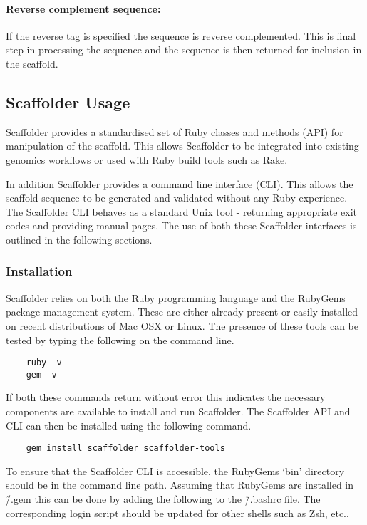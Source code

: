 \documentclass[10pt]{bmc_article}
\newenvironment{bmcformat}{\begin{raggedright}\baselineskip20pt\sloppy\setboolean{publ}{false}}{\end{raggedright}\baselineskip20pt\sloppy}
\begin{document}
\begin{bmcformat}
\paragraph{Reverse complement sequence:} If the reverse tag is specified the
sequence is reverse complemented. This is final step in processing the
sequence and the sequence is then returned for inclusion in the scaffold. \pb

\subsection*{Scaffolder Usage} %

Scaffolder provides a standardised set of Ruby classes and methods (API) for
manipulation of the scaffold. This allows Scaffolder to be integrated into
existing genomics workflows or used with Ruby build tools such as Rake. \pb

In addition Scaffolder provides a command line interface (CLI). This allows
the scaffold sequence to be generated and validated without any Ruby
experience. The Scaffolder CLI behaves as a standard Unix tool - returning
appropriate exit codes and providing manual pages. The use of both these
Scaffolder interfaces is outlined in the following sections. \pb

\subsubsection*{Installation} %

Scaffolder relies on both the Ruby programming language and the RubyGems
package management system. These are either already present or easily
installed on recent distributions of Mac OSX or Linux. The presence of these
tools can be tested by typing the following on the command line. \pb

  \begin{verbatim}
    ruby -v
    gem -v
  \end{verbatim}

If both these commands return without error this indicates the necessary
components are available to install and run Scaffolder. The Scaffolder API and
CLI can then be installed using the following command. \pb

  \begin{verbatim}
    gem install scaffolder scaffolder-tools
  \end{verbatim}

To ensure that the Scaffolder CLI is accessible, the RubyGems `bin' directory
should be in the command line path. Assuming that RubyGems are installed in
\~/.gem this can be done by adding the following to the \~/.bashrc file. The
corresponding login script should be updated for other shells such as Zsh,
etc.. \pb


\end{bmcformat}
\end{document}
